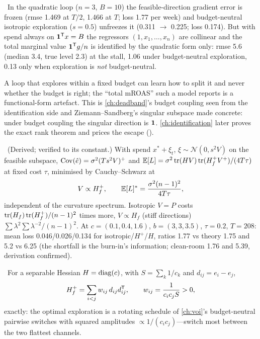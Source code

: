 \begin{proposition}
\label{fb:prop:budget}
\tagNumerical\ In the quadratic loop ($n = 3$, $B = 10$) the feasible-direction gradient error is frozen (rmse 1.469 at $T/2$, 1.466 at $T$; loss 1.77 per week) and budget-neutral isotropic exploration ($s = 0.5$) unfreezes it (0.311 $\to$ 0.225; loss 0.174). But with spend always on $\mathbf{1}^{\mathsf{T}} x = B$ the regressors $(1, x_1, \ldots, x_n)$ are collinear and the total marginal value $\mathbf{1}^{\mathsf{T}} g/n$ is identified by the quadratic form only: rmse 5.6 (median 3.4, true level 2.3) at the stall, 1.06 under budget-neutral exploration, 0.13 only when exploration is \emph{not} budget-neutral.
\end{proposition}

A loop that explores within a fixed budget can learn how to split it and never whether the budget is right; the ``total mROAS'' such a model reports is a functional-form artefact. This is \cref{ch:deadband}'s budget coupling seen from the identification side and Ziemann--Sandberg's singular subspace made concrete: under budget coupling the singular direction is $\mathbf{1}$. \cref{ch:identification} later proves the exact rank theorem and prices the escape ().

\begin{law}
\label{fb:law:whiten}
\tagEstablished\ (Derived; verified to its constant.) With spend $x^* + \xi_t$, $\xi \sim \mathcal N(0, s^2V)$ on the feasible subspace, $\operatorname{Cov}(\hat e) = \sigma^2(Ts^2V)^+$ and $\mathbb{E}[L] = \sigma^2\operatorname{tr}(HV)\operatorname{tr}(H_f^+V^+)/(4T\tau)$ at fixed cost $\tau$, minimised by Cauchy--Schwarz at
\begin{equation}
V \propto H_f^+,\qquad \mathbb{E}[L]^* = \frac{\sigma^2(n-1)^2}{4T\tau},
\label{eq:fb:whiten}
\end{equation}
independent of the curvature spectrum. Isotropic $V = P$ costs $\operatorname{tr}(H_f)\operatorname{tr}(H_f^+)/(n-1)^2$ times more, $V \propto H_f$ (stiff directions) $\sum\lambda^2\sum\lambda^{-2}/(n-1)^2$. At $c = (0.1, 0.4, 1.6)$, $b = (3, 3, 3.5)$, $\tau = 0.2$, $T = 208$: mean loss 0.046/0.026/0.134 for isotropic/$H^+$/$H$, ratios 1.77 vs theory 1.75 and 5.2 vs 6.25 (the shortfall is the burn-in's information; clean-room 1.76 and 5.39, derivation confirmed).
\end{law}

\begin{theorem}
\label{fb:thm:switch}
\tagEstablished\ For a separable Hessian $H = \operatorname{diag}(c)$, with $S = \sum_k1/c_k$ and $d_{ij} = e_i - e_j$,
\begin{equation}
H_f^+ = \sum_{i<j}w_{ij}\,d_{ij}d_{ij}^{\mathsf{T}},\qquad w_{ij} = \frac{1}{c_ic_jS} > 0,
\label{eq:fb:switch}
\end{equation}
exactly: the optimal exploration is a rotating schedule of \cref{ch:voi}'s budget-neutral pairwise switches with squared amplitudes $\propto 1/(c_ic_j)$---switch most between the two flattest channels.
\end{theorem}

